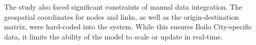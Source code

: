 The study also faced significant constraints of manual data integration. The geospatial coordinates for nodes and links, as well as the origin-destination matrix, were hard-coded into the system. While this ensures Iloilo City-specific data, it limits the ability of the model to scale or update in real-time.













